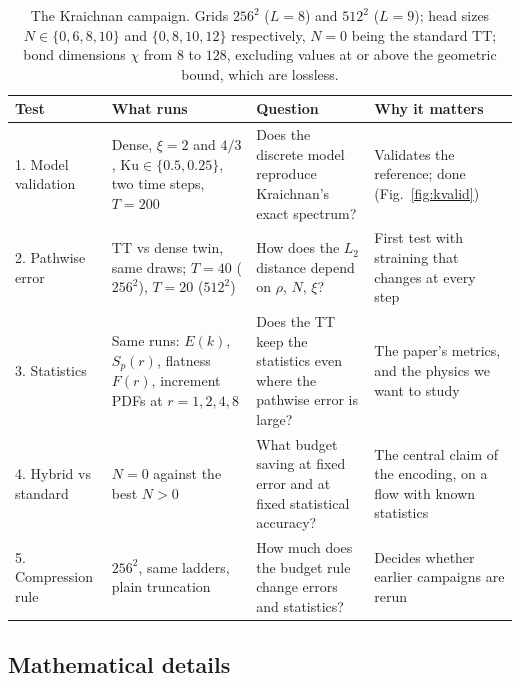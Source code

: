 \documentclass[aps,prfluids,reprint,onecolumn,amsmath,amssymb,nofootinbib,floatfix]{revtex4-2}
\begin{document}
\begin{table}[t]
\caption{The Kraichnan campaign. Grids $256^2$ ($L=8$) and $512^2$ ($L=9$);
head sizes $N\in\{0,6,8,10\}$ and $\{0,8,10,12\}$ respectively, $N=0$ being the
standard TT; bond dimensions $\chi$ from $8$ to $128$, excluding values at or above
the geometric bound, which are lossless.}
\label{tab:ktests}
\begin{ruledtabular}
\begin{tabular}{p{2.5cm}p{4.2cm}p{4.6cm}p{4.5cm}}
Test & What runs & Question & Why it matters\\
\hline
1. Model validation & Dense, $\xi=2$ and $4/3$, $\mathrm{Ku}\in\{0.5,0.25\}$, two time steps, $T=200$ & Does the discrete model reproduce Kraichnan's exact spectrum? & Validates the reference; done (Fig.~\ref{fig:kvalid})\\
2. Pathwise error & TT vs dense twin, same draws; $T=40$ ($256^2$), $T=20$ ($512^2$) & How does the $L_2$ distance depend on $\rho$, $N$, $\xi$? & First test with straining that changes at every step\\
3. Statistics & Same runs: $E(k)$, $S_p(r)$, flatness $F(r)$, increment PDFs at $r=1,2,4,8$ & Does the TT keep the statistics even where the pathwise error is large? & The paper's metrics, and the physics we want to study\\
4. Hybrid vs standard & $N=0$ against the best $N>0$ & What budget saving at fixed error and at fixed statistical accuracy? & The central claim of the encoding, on a flow with known statistics\\
5. Compression rule & $256^2$, same ladders, plain truncation & How much does the budget rule change errors and statistics? & Decides whether earlier campaigns are rerun\\
\end{tabular}
\end{ruledtabular}
\end{table}

\subsection{Mathematical details}
\end{document}
